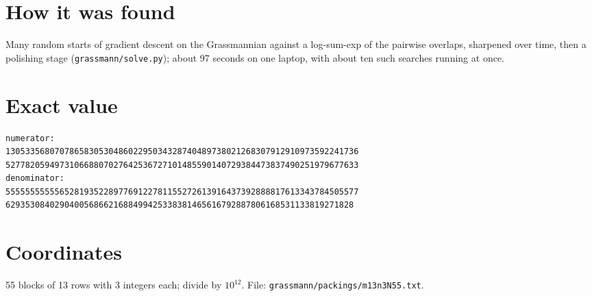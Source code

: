 \documentclass[11pt,a4paper]{article}
\begin{document}
\section{How it was found}
Many random starts of gradient descent on the Grassmannian against a log-sum-exp of the pairwise overlaps, sharpened over time, then a polishing stage (\texttt{grassmann/solve.py}); about 97 seconds on one laptop, with about ten such searches running at once.


\appendix
\section{Exact value}
{\small
\begin{verbatim}
numerator:
130533568070786583053048602295034328740489738021268307912910973592241736
527782059497310668807027642536727101485590140729384473837490251979677633
denominator:
555555555556528193522897769122781155272613916437392888817613343784505577
62935308402904005686621688499425338381465616792887806168531133819271828
\end{verbatim}}

\section{Coordinates}
55 blocks of 13 rows with 3 integers each; divide by $10^{12}$. File: \texttt{grassmann/packings/m13n3N55.txt}.
{\tiny
\begin{multicols}{3}
\end{multicols}}
\end{document}

